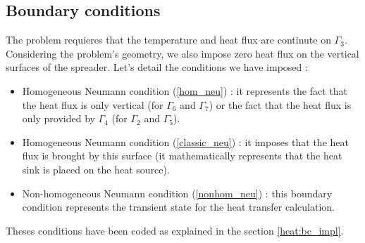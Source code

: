 \subsection{Boundary conditions}
\label{heat:bc}
The problem requieres that the temperature and heat flux are continute on $\Gamma_3$. Considering the problem's geometry, we also impose zero heat flux on the vertical surfaces of the spreader. Let's detail the conditions we have imposed :
\begin{itemize}
\item Homogeneous Neumann condition (\ref{hom_neu}) : it represents the fact that the heat flux is only vertical (for $\Gamma_6$ and $\Gamma_7$) or the fact that the heat flux is only provided by $\Gamma_4$ (for $\Gamma_2$ and $\Gamma_5$).

\item Homogeneous Neumann condition (\ref{classic_neu}) : it imposes that the heat flux is brought by this surface (it mathematically represents that the heat sink is placed on the heat source).

\item Non-homogeneous Neumann condition (\ref{nonhom_neu}) :  this boundary condition represents the transient state for the heat transfer calculation.
\end{itemize}

\noindent Theses conditions have been coded as explained in the section \ref{heat:bc_impl}.

